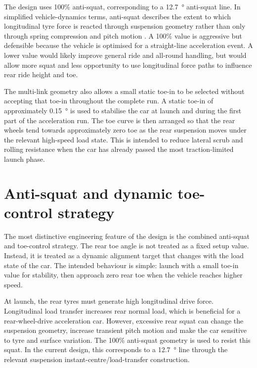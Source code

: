 
The design uses 100\% anti-squat, corresponding to a \SI{12.7}{\degree} anti-squat line. In simplified vehicle-dynamics terms, anti-squat describes the extent to which longitudinal tyre force is reacted through suspension geometry rather than only through spring compression and pitch motion \parencite{gillespie1992,milliken1995}. A 100\% value is aggressive but defensible because the vehicle is optimised for a straight-line acceleration event. A lower value would likely improve general ride and all-round handling, but would allow more squat and less opportunity to use longitudinal force paths to influence rear ride height and toe.

The multi-link geometry also allows a small static toe-in to be selected without accepting that toe-in throughout the complete run. A static toe-in of approximately \SI{0.15}{\degree} is used to stabilise the car at launch and during the first part of the acceleration run. The toe curve is then arranged so that the rear wheels tend towards approximately zero toe as the rear suspension moves under the relevant high-speed load state. This is intended to reduce lateral scrub and rolling resistance when the car has already passed the most traction-limited launch phase.

\section{Anti-squat and dynamic toe-control strategy}
\label{sec:antisquat_dynamic_toe}

The most distinctive engineering feature of the design is the combined anti-squat and toe-control strategy. The rear toe angle is not treated as a fixed setup value. Instead, it is treated as a dynamic alignment target that changes with the load state of the car. The intended behaviour is simple: launch with a small toe-in value for stability, then approach zero rear toe when the vehicle reaches higher speed.

At launch, the rear tyres must generate high longitudinal drive force. Longitudinal load transfer increases rear normal load, which is beneficial for a rear-wheel-drive acceleration car. However, excessive rear squat can change the suspension geometry, increase transient pitch motion and make the car sensitive to tyre and surface variation. The 100\% anti-squat geometry is used to resist this squat. In the current design, this corresponds to a \SI{12.7}{\degree} line through the relevant suspension instant-centre/load-transfer construction.

